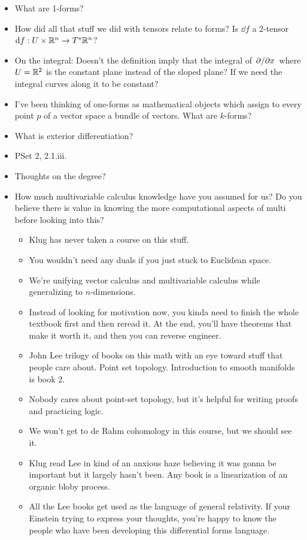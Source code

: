 \documentclass[../notes.tex]{subfiles}
\begin{document}
\begin{itemize}
    \item What are 1-forms?
    \item How did all that stuff we did with tensors relate to forms? Is $\dd f$ a 2-tensor $\dd f:U\times\mathbb{R}^n\to T^*\mathbb{R}^n$?
    \item On the integral: Doesn't the definition imply that the integral of $\pdv*{x}$ where $U=\mathbb{R}^2$ is the constant plane instead of the sloped plane? If we need the integral curves along it to be constant?
    \item I've been thinking of one-forms as mathematical objects which assign to every point $p$ of a vector space a bundle of vectors. What are $k$-forms?
    \item What is exterior differentiation?
    \item PSet 2, 2.1.iii.
    \item Thoughts on the degree?
    \item How much multivariable calculus knowledge have you assumed for us? Do you believe there is value in knowing the more computational aspects of multi before looking into this?
    \begin{itemize}
        \item Klug has never taken a course on this stuff.
        \item You wouldn't need any duals if you just stuck to Euclidean space.
        \item We're unifying vector calculus and multivariable calculus while generalizing to $n$-dimensions.
        \item Instead of looking for motivation now, you kinda need to finish the whole textbook first and then reread it. At the end, you'll have theorems that make it worth it, and then you can reverse engineer.
        \item John Lee trilogy of books on this math with an eye toward stuff that people care about. Point set topology. Introduction to smooth manifolds is book 2.
        \item Nobody cares about point-set topology, but it's helpful for writing proofs and practicing logic.
        \item We won't get to de Rahm cohomology in this course, but we should see it.
        \item Klug read Lee in kind of an anxious haze believing it was gonna be important but it largely hasn't been. Any book is a linearization of an organic bloby process.
        \item All the Lee books get used as the language of general relativity. If your Einstein trying to express your thoughts, you're happy to know the people who have been developing this differential forms language.

\end{itemize}
\end{itemize}
\end{document}

